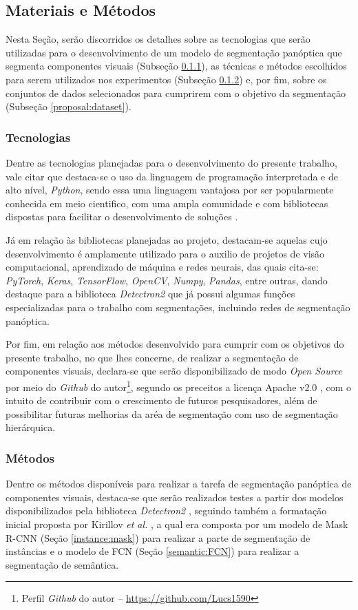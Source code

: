 \subsection{Materiais e Métodos}
\label{proposal:matmet}
Nesta Seção, serão discorridos os detalhes sobre as tecnologias que serão utilizadas para o desenvolvimento de um modelo de segmentação panóptica que segmenta componentes visuais (Subseção \ref{proposal:tec}), as técnicas e métodos escolhidos para serem utilizados nos experimentos (Subseção \ref{proposal:method}) e, por fim, sobre os conjuntos de dados selecionados para cumprirem com o objetivo da segmentação (Subseção \ref{proposal:dataset}).


\subsubsection{Tecnologias}
\label{proposal:tec}
Dentre as tecnologias planejadas para o desenvolvimento do presente trabalho, vale citar que destaca-se o uso da linguagem de programação interpretada e de alto nível, \textit{Python}, sendo essa uma linguagem vantajosa por ser popularmente conhecida em meio cientifico, com uma ampla comunidade e com  bibliotecas dispostas para facilitar o desenvolvimento de soluções \cite{Millman2011PythonEngineers}.

Já em relação às bibliotecas planejadas ao projeto, destacam-se aquelas cujo desenvolvimento é amplamente utilizado para o auxilio de projetos de visão computacional, aprendizado de máquina e redes neurais, das quais cita-se: \textit{PyTorch}, \textit{Keras}, \textit{TensorFlow}, \textit{OpenCV}, \textit{Numpy}, \textit{Pandas}, entre outras, dando destaque para a biblioteca \textit{Detectron2} \cite{detectron2} que já possui algumas funções especializadas para o trabalho com segmentações, incluindo redes de segmentação panóptica.

Por fim, em relação aos métodos desenvolvido para cumprir com os objetivos do presente trabalho, no que lhes concerne, de realizar a segmentação de componentes visuais, declara-se que serão disponibilizado de modo \textit{Open Source} por meio do \textit{Github} do autor\footnote{Perfil \textit{Github} do autor – \url{https://github.com/Lucs1590}}, segundo os preceitos a licença Apache v2.0 \cite{Licenses}, com o intuito de contribuir com o crescimento de futuros pesquisadores, além de possibilitar futuras melhorias da aréa de segmentação com uso de segmentação hierárquica.


\subsubsection{Métodos}
\label{proposal:method}
Dentre os métodos disponíveis para realizar a tarefa de segmentação panóptica de componentes visuais, destaca-se que serão realizados testes a partir dos modelos disponibilizados pela biblioteca \textit{Detectron2} \cite{detectron2}, seguindo também a formatação inicial proposta por Kirillov \textit{et al.} \cite{Kirillov2019a}, a qual era composta por um modelo de Mask R-CNN (Seção \ref{instance:mask}) para realizar a parte de segmentação de instâncias e o modelo de FCN (Seção \ref{semantic:FCN}) para realizar a segmentação de semântica.

